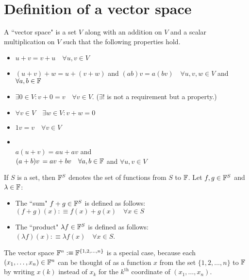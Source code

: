\section{Definition of a vector space}

\setcounter{thm}{19}
\begin{mydef}
  A ``vector space" is a set $V$ along with an addition on $V$ and a scalar multiplication on $V$ such that the following properties hold.
  \begin{itemize}
    \item {}
    $ u+v = v+u \quad \forall u,v \in V$
    \item {}
    $(u+v)+w=u+(v+w)$ and $(ab)v=a(bv) \quad \forall u,v,w \in V$ and $\forall a,b \in \mathbb{F}$
    \item {}
    $\exists 0\in V:v+0=v \quad \forall v\in V$. ($\exists!$ is not a requirement but a property.)
    \item {}
    $\forall v\in V \quad \exists w\in V: v+w=0$
    \item {}
    $1v = v \quad \forall v\in V$
    \item {}\\
    $a(u+v) = au+av$ and  \\
    $(a+b)v \, = av + bv \quad \forall a,b \in \mathbb{F}$ and
    $\forall u,v \in V$
  \end{itemize}
\end{mydef}

\setcounter{thm}{23}
\begin{mydef}
  If $S$ is a set, then $\mathbb{F}^S$ denotes the set of functions from $S$ to $\mathbb{F}$. Let $f, g \in \mathbb{F}^{S}$ and $\lambda \in \mathbb{F}$:
  \begin{itemize}
    \item The ``sum" $f+g \in \mathbb{F}^{S}$ is defined as follows: $(f+g)(x) :\equiv f(x)+ g(x) \quad \forall x\in S$
    \item The ``product" $\lambda f \in \mathbb{F}^{S}$ is defined as follows: $(\lambda f)(x) :\equiv \lambda f(x) \quad \forall x \in S$.
  \end{itemize}
  The vector space $\mathbb{F}^{n} :\equiv \mathbb{F}^{\{1,2,\dots,n\}}$ is a special case, because each $(x_1, \dots, x_n) \in \mathbb{F}^{n}$ can be thought of as a function $x$ from the set $\{1, 2, \dots, n\}$ to $\mathbb{F}$ by writing $x(k)$ instead of $x_k$ for the $k^{\text{th}}$ coordinate of $(x_1, \dots, x_n)$.
\end{mydef}


